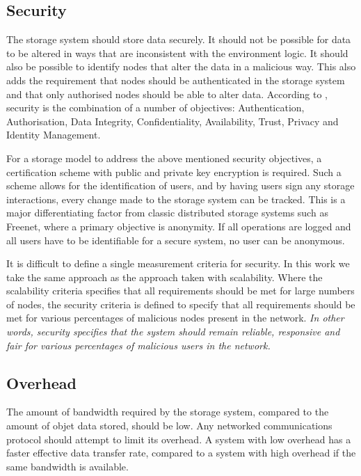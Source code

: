 \subsection{Security}
\label{characteristics_security}

The storage system should store data securely. It should not be possible for data to be altered in ways that are inconsistent with the environment logic. It should also be possible to identify nodes that alter the data in a malicious way. This also adds the requirement that nodes should be authenticated in the storage system and that only authorised nodes should be able to alter data. According to \cite{distributed_systems_security}, security is the combination of a number of objectives: Authentication, Authorisation, Data Integrity, Confidentiality, Availability, Trust, Privacy and Identity Management.

For a storage model to address the above mentioned security objectives, a certification scheme with public and private key encryption is required. Such a scheme allows for the identification of users, and by having users sign any storage interactions, every change made to the storage system can be tracked. This is a major differentiating factor from classic distributed storage systems such as Freenet, where a primary objective is anonymity. If all operations are logged and all users have to be identifiable for a secure system, no user can be anonymous.

It is difficult to define a single measurement criteria for security. In this work we take the same approach as the approach taken with scalability. Where the scalability criteria specifies that all requirements should be met for large numbers of nodes, the security criteria is defined to specify that all requirements should be met for various percentages of malicious nodes present in the network. \emph{In other words, security specifies that the system should remain reliable, responsive and fair for various percentages of malicious users in the network.}

\subsection{Overhead}
\label{characteristics_overhead}

The amount of bandwidth required by the storage system, compared to the amount of objet data stored, should be low. Any networked communications protocol should attempt to limit its overhead. A system with low overhead has a faster effective data transfer rate, compared to a system with high overhead if the same bandwidth is available.

